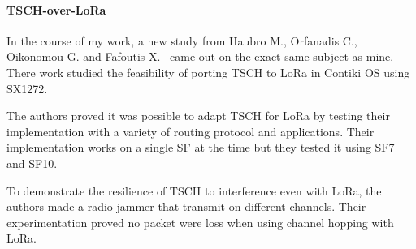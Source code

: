 \paragraph{TSCH-over-LoRa}

In the course of my work, a new study from Haubro M., Orfanadis C.,
Oikonomou G. and Fafoutis X.~\cite{tschoverlora} came out on the exact 
same subject as mine. There work studied the feasibility of porting 
TSCH to LoRa in Contiki OS using SX1272.

The authors proved it was possible to adapt TSCH for LoRa by testing their
implementation with a variety of routing protocol and applications.
Their implementation works on a single SF at the time but they tested it using
SF7 and SF10.

To demonstrate the resilience of TSCH to interference even with LoRa, the
authors made a radio jammer that transmit on different channels. Their
experimentation proved no packet were loss when using channel hopping with
LoRa.
